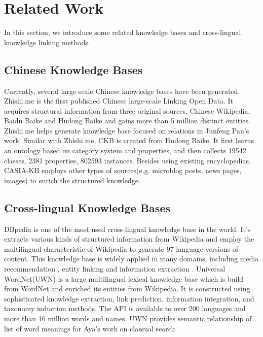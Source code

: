\documentclass[runningheads,a4paper]{llncs}
\begin{document}

\section{Related Work}
\label{sec:work}
In this section, we introduce some related knowledge bases and cross-lingual knowledge linking methods.
\subsection{Chinese Knowledge Bases}
Currently, several large-scale Chinese knowledge bases have been generated. Zhishi.me\cite{niu2011zhishi,wang2014publishing} is the first published Chinese large-scale Linking Open Data. It acquires structural information from three original sources, Chinese Wikipedia, Baidu Baike and Hudong Baike and gains more than 5 million distinct entities. Zhishi.me helps generate knowledge base focused on relations in Junfeng Pan’s work\cite{pan2012building}.
Similar with Zhishi.me, CKB\cite{wang2012building} is created from Hudong Baike. It first learns an ontology based on category system and properties, and then collects 19542 classes, 2381 properties, 802593 instances. Besides using existing encyclopedias, CASIA-KB employs other types of sources(e.g. microblog posts, news pages, images) to enrich the structured knowledge.
\subsection{Cross-lingual Knowledge Bases}
DBpedia \cite{auer2007dbpedia,mendes2012dbpedia} is one of the most used cross-lingual knowledge base in the world. It's extracts various kinds of structured information from Wikipedia and employ the multilingual characteristic of Wikipedia to generate 97 language versions of content. This knowledge base is widely applied in many domains, including media recommendation \cite{passant2010dbrec,fernandez2011generic,kaminskas2012knowledge}, entity linking\cite{mendes2011evaluating} and information extraction \cite{dutta2013integrating}.
Universal WordNet(UWN)\cite{de2012uwn} is a large multilingual lexical knowledge base which is build from WordNet and enriched its entities from Wikipedia. It is constructed using sophisticated knowledge extraction, link prediction, information integration, and taxonomy induction methods. The API is available to over 200 languages and more than 16 million words and names. UWN provides semantic relationship of list of word meanings for Aya's work on classual search \cite{al2015classual}
\end{document}
